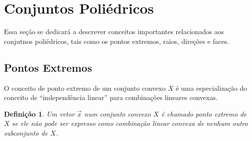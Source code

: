 \newtheorem{def:ponto extremo}[def:conjunto convexo]{Definição}

\newtheorem{def:hiperplano definidor}[def:conjunto convexo]{Definição}

\newtheorem{def:raio}[def:conjunto convexo]{Definição}

\newtheorem{def:direção}[def:conjunto convexo]{Definição}

\newtheorem{def:direção extrema}[def:conjunto convexo]{Definição}

\newtheorem{def:ponto degenerado}[def:conjunto convexo]{Definição}

\newtheorem{def:face}[def:conjunto convexo]{Definição}

\newtheorem{def:r face}[def:conjunto convexo]{Definição}

\newtheorem{def:dimensao face}[def:conjunto convexo]{Definição}


\newtheorem{prop:combinação convexa}{Proposição}[chapter]

\newtheorem{prop:hiperplano e ponto extremo}[prop:combinação convexa]{Proposição}

\newtheorem{prop:direção}[prop:combinação convexa]{Proposição}

\newtheorem{prop:aresta}[prop:combinação convexa]{Proposição}


\newtheorem{thm:ponto extremo}{Teorema}[chapter]

\section{Conjuntos Poliédricos}

Essa seção se dedicará a descrever conceitos importantes relacionados aos
conjutnos poliédricos, tais como os pontos extremos, raios, direções e faces.

\subsection{Pontos Extremos}

O conceito de ponto extremo de um conjunto convexo $X
$ é uma
especialização do conceito de ``independência linear'' para combinações
lineares convexas.

\begin{def:ponto extremo}
	Um vetor $\vec x$ num conjunto convexo $X$ é chamado ponto extremo de
	$X$ se ele não pode ser expresso como combinação linear
	convexa de nenhum outro subconjunto de $X$.
\end{def:ponto extremo}

